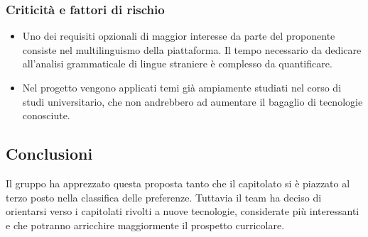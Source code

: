 \subsubsection{Criticità e fattori di rischio}
\begin{itemize}
	\item Uno dei requisiti opzionali di maggior interesse da parte del proponente consiste nel multilinguismo della piattaforma. Il tempo necessario da dedicare all'analisi grammaticale di lingue straniere è complesso da quantificare.
	
	\item Nel progetto vengono applicati temi già ampiamente studiati nel corso di studi universitario, che non andrebbero ad aumentare il bagaglio di tecnologie conosciute.
 	
\end{itemize}
\subsection{Conclusioni}
Il gruppo ha apprezzato questa proposta tanto che il capitolato si è piazzato al terzo posto nella classifica delle preferenze. Tuttavia il team ha deciso di orientarsi verso i capitolati rivolti a nuove tecnologie, considerate più interessanti e che potranno arricchire maggiormente il prospetto curricolare. 


